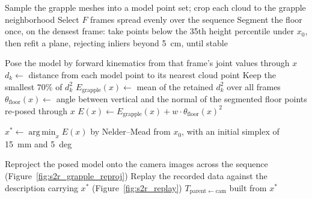 \begin{algorithm}[t]
\caption{Grapple-based, floor-constrained camera extrinsic calibration}
\label{alg:grapple_calib}
\begin{algorithmic}

\State Sample the grapple meshes into a model point set; crop each cloud to the grapple neighborhood
\State Select $F$ frames spread evenly over the sequence
\State Segment the floor once, on the densest frame: take points below the
       35th height percentile under $x_0$, then refit a plane, rejecting
       inliers beyond 5~cm, until stable

  \State Pose the model by forward kinematics from that frame's joint values through $x$
  \State $d_k \gets$ distance from each model point to its nearest cloud point
  \State Keep the smallest $70\%$ of $d_k^2$
\EndFor
\State $E_{\mathrm{grapple}}(x) \gets$ mean of the retained $d_k^2$ over all frames
\State $\theta_{\mathrm{floor}}(x) \gets$ angle between vertical and the normal
       of the segmented floor points re-posed through $x$
\State $E(x) \gets E_{\mathrm{grapple}}(x) + w \cdot \theta_{\mathrm{floor}}(x)^2$

\State $x^{*} \gets \operatorname*{arg\,min}_{x} E(x)$ by Nelder--Mead from
       $x_0$, with an initial simplex of 15~mm and 5~deg

\State Reproject the posed model onto the camera images across the sequence
       (Figure~\ref{fig:s2r_grapple_reproj})
\State Replay the recorded data against the description carrying $x^{*}$
       (Figure~\ref{fig:s2r_replay})
\State \Return $T_{\mathrm{parent} \leftarrow \mathrm{cam}}$ built from $x^{*}$
\end{algorithmic}
\end{algorithm}

